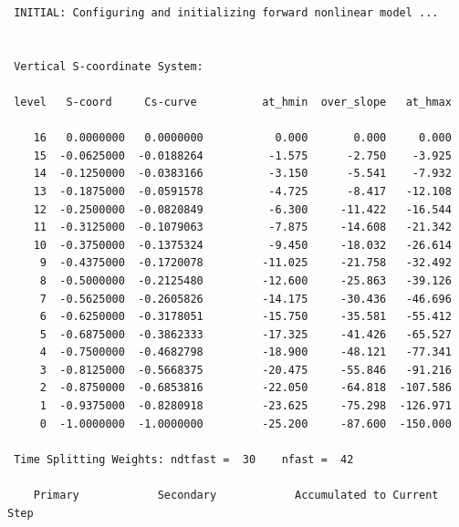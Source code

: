 \begin{verbatim}
 INITIAL: Configuring and initializing forward nonlinear model ...


 Vertical S-coordinate System: 

 level   S-coord     Cs-curve          at_hmin  over_slope   at_hmax

    16   0.0000000   0.0000000           0.000       0.000     0.000
    15  -0.0625000  -0.0188264          -1.575      -2.750    -3.925
    14  -0.1250000  -0.0383166          -3.150      -5.541    -7.932
    13  -0.1875000  -0.0591578          -4.725      -8.417   -12.108
    12  -0.2500000  -0.0820849          -6.300     -11.422   -16.544
    11  -0.3125000  -0.1079063          -7.875     -14.608   -21.342
    10  -0.3750000  -0.1375324          -9.450     -18.032   -26.614
     9  -0.4375000  -0.1720078         -11.025     -21.758   -32.492
     8  -0.5000000  -0.2125480         -12.600     -25.863   -39.126
     7  -0.5625000  -0.2605826         -14.175     -30.436   -46.696
     6  -0.6250000  -0.3178051         -15.750     -35.581   -55.412
     5  -0.6875000  -0.3862333         -17.325     -41.426   -65.527
     4  -0.7500000  -0.4682798         -18.900     -48.121   -77.341
     3  -0.8125000  -0.5668375         -20.475     -55.846   -91.216
     2  -0.8750000  -0.6853816         -22.050     -64.818  -107.586
     1  -0.9375000  -0.8280918         -23.625     -75.298  -126.971
     0  -1.0000000  -1.0000000         -25.200     -87.600  -150.000

 Time Splitting Weights: ndtfast =  30    nfast =  42

    Primary            Secondary            Accumulated to Current Step


\end{verbatim}
